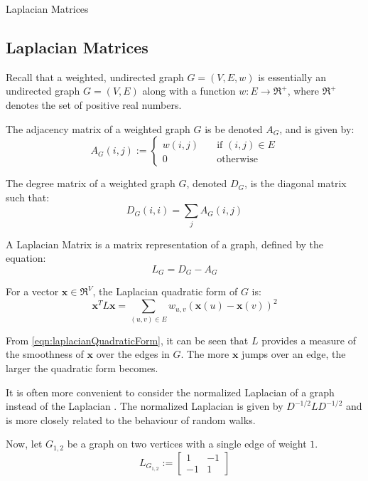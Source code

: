 Laplacian Matrices
\subsection{Laplacian Matrices}
\label{vectorsAndMatrices:laplacian}
\nocite{Berkeley:1999,Pati:2011,Spielman:2006}
Recall that a weighted, undirected graph $G = (V,E,w)$ is essentially an
undirected graph $G = (V,E)$ along with a function $w : E \rightarrow
\Re^{+}$, where $\Re^{+}$ denotes the set of positive real numbers.

The adjacency matrix of a weighted graph $G$ is be denoted $A_{G}$, and is
given by:
\begin{equation}
A_{G}(i,j) :=
    \left\{
        \begin{array}{ll}
            \mathit{w}(i,j) &   \quad \text{if $(i,j) \in E$}\\
            0 &                 \quad \text{otherwise}
        \end{array}
    \right.
\end{equation}

The degree matrix of a weighted graph $G$, denoted $D_{G}$, is the diagonal
matrix such that:
\begin{equation}
D_{G}(i,i) = \sum_{j} A_{G}(i,j)
\end{equation}

A Laplacian Matrix is a matrix representation of a graph, defined by the
equation:
\begin{equation}
L_{G} = D_{G} - A_{G}
\end{equation}

For a vector $\textbf{x} \in \Re^{V}$, the Laplacian quadratic form of $G$ is:
\begin{equation}
\label{laplacianQuadraticForm}
\textbf{x}^{T} L \textbf{x} = \sum_{(u,v) \in E} w_{u,v}(\textbf{x}(u) - \textbf{x}(v))^2
\end{equation}

From \autoref{eqn:laplacianQuadraticForm}, it can be seen that $L$ provides a
measure of the smoothness of $\textbf{x}$ over the edges in $G$. The more
$\textbf{x}$ jumps over an edge, the larger the quadratic form becomes.

It is often more convenient to consider the normalized Laplacian of a graph
instead of the Laplacian \cite{Spielman:2010}. The normalized Laplacian is given
by $D^{-1/2}LD^{-1/2}$ and is more closely related to the behaviour of random
walks.

Now, let $G_{1,2}$ be a graph on two vertices with a single edge of weight $1$.
\begin{equation}
L_{G_{1,2}} :=
    \begin{bmatrix}
        1 & -1\\
        -1 & 1
    \end{bmatrix}
\end{equation}

